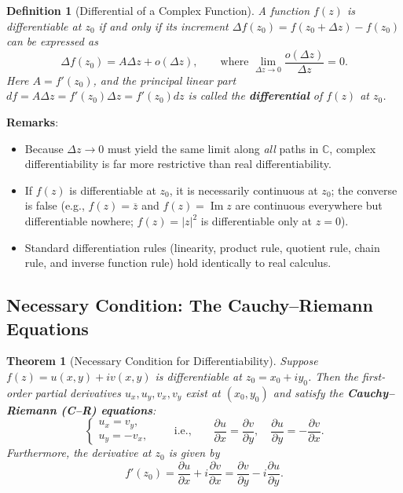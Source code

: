 \documentclass[11pt,a4paper]{article}
\theoremstyle{definitionbreak}
\newtheorem{definition}{Definition}
\theoremstyle{examplebreak}
\theoremstyle{theorembreak}
\newtheorem{theorem}{Theorem}
\begin{document}
\begin{definition}[Differential of a Complex Function]
A function $f(z)$ is differentiable at $z_0$ if and only if its increment $\Delta f(z_0) = f(z_0 + \Delta z) - f(z_0)$ can be expressed as
\[
    \Delta f(z_0) = A \Delta z + o(\Delta z), \qquad \text{where } \lim_{\Delta z \to 0} \frac{o(\Delta z)}{\Delta z} = 0.
\]
Here $A = f'(z_0)$, and the principal linear part $df = A \Delta z = f'(z_0)\Delta z = f'(z_0)dz$ is called the \textbf{differential} of $f(z)$ at $z_0$.
\end{definition}

\textbf{Remarks}:
\begin{itemize}
    \item Because $\Delta z \to 0$ must yield the same limit along \emph{all} paths in $\mathbb{C}$, complex differentiability is far more restrictive than real differentiability.
    \item If $f(z)$ is differentiable at $z_0$, it is necessarily continuous at $z_0$; the converse is false (e.g., $f(z) = \overline{z}$ and $f(z) = \operatorname{Im} z$ are continuous everywhere but differentiable nowhere; $f(z) = |z|^2$ is differentiable only at $z = 0$).
    \item Standard differentiation rules (linearity, product rule, quotient rule, chain rule, and inverse function rule) hold identically to real calculus.
\end{itemize}

\subsection{Necessary Condition: The Cauchy--Riemann Equations}

\begin{theorem}[Necessary Condition for Differentiability]
Suppose $f(z) = u(x, y) + iv(x, y)$ is differentiable at $z_0 = x_0 + iy_0$. Then the first-order partial derivatives $u_x, u_y, v_x, v_y$ exist at $(x_0, y_0)$ and satisfy the \textbf{Cauchy--Riemann (C--R) equations}:
\[
    \begin{cases}
        u_x = v_y, \\
        u_y = -v_x,
    \end{cases}
    \qquad \text{i.e.,} \qquad
    \frac{\partial u}{\partial x} = \frac{\partial v}{\partial y}, \quad \frac{\partial u}{\partial y} = -\frac{\partial v}{\partial x}.
\]
Furthermore, the derivative at $z_0$ is given by
\[
    f'(z_0) = \frac{\partial u}{\partial x} + i\frac{\partial v}{\partial x} = \frac{\partial v}{\partial y} - i\frac{\partial u}{\partial y}.
\]
\end{theorem}
\end{document}
